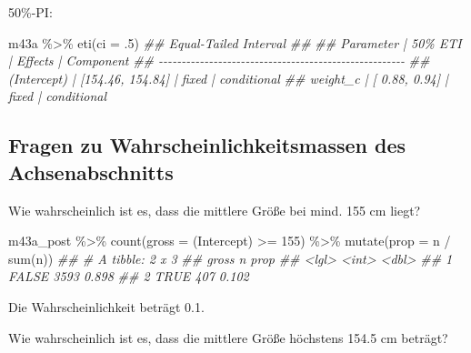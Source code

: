 \documentclass[
  a4paper,
  DIV=11]{scrreprt}
\newenvironment{Shaded}{\begin{snugshade}}{\end{snugshade}}
\newcommand{\AttributeTok}[1]{\textcolor[rgb]{0.40,0.45,0.13}{#1}}
\newcommand{\DecValTok}[1]{\textcolor[rgb]{0.68,0.00,0.00}{#1}}
\newcommand{\DocumentationTok}[1]{\textcolor[rgb]{0.37,0.37,0.37}{\textit{#1}}}
\newcommand{\FunctionTok}[1]{\textcolor[rgb]{0.28,0.35,0.67}{#1}}
\newcommand{\NormalTok}[1]{\textcolor[rgb]{0.00,0.23,0.31}{#1}}
\newcommand{\SpecialCharTok}[1]{\textcolor[rgb]{0.37,0.37,0.37}{#1}}
\newcommand{\StringTok}[1]{\textcolor[rgb]{0.13,0.47,0.30}{#1}}
\theoremstyle{definition}
\theoremstyle{remark}
\begin{document}
50\%-PI:

\begin{Shaded}
\begin{Highlighting}[]
\NormalTok{m43a }\SpecialCharTok{\%\textgreater{}\%} 
  \FunctionTok{eti}\NormalTok{(}\AttributeTok{ci =}\NormalTok{ .}\DecValTok{5}\NormalTok{)}
\DocumentationTok{\#\# Equal{-}Tailed Interval}
\DocumentationTok{\#\# }
\DocumentationTok{\#\# Parameter   |          50\% ETI | Effects |   Component}
\DocumentationTok{\#\# {-}{-}{-}{-}{-}{-}{-}{-}{-}{-}{-}{-}{-}{-}{-}{-}{-}{-}{-}{-}{-}{-}{-}{-}{-}{-}{-}{-}{-}{-}{-}{-}{-}{-}{-}{-}{-}{-}{-}{-}{-}{-}{-}{-}{-}{-}{-}{-}{-}{-}{-}{-}{-}{-}}
\DocumentationTok{\#\# (Intercept) | [154.46, 154.84] |   fixed | conditional}
\DocumentationTok{\#\# weight\_c    | [  0.88,   0.94] |   fixed | conditional}
\end{Highlighting}
\end{Shaded}

\hypertarget{fragen-zu-wahrscheinlichkeitsmassen-des-achsenabschnitts}{%
\subsection{Fragen zu Wahrscheinlichkeitsmassen des
Achsenabschnitts}\label{fragen-zu-wahrscheinlichkeitsmassen-des-achsenabschnitts}}

Wie wahrscheinlich ist es, dass die mittlere Größe bei mind. 155 cm
liegt?

\begin{Shaded}
\begin{Highlighting}[]
\NormalTok{m43a\_post }\SpecialCharTok{\%\textgreater{}\%} 
  \FunctionTok{count}\NormalTok{(}\AttributeTok{gross =} \StringTok{\textasciigrave{}}\AttributeTok{(Intercept)}\StringTok{\textasciigrave{}} \SpecialCharTok{\textgreater{}=} \DecValTok{155}\NormalTok{) }\SpecialCharTok{\%\textgreater{}\%} 
  \FunctionTok{mutate}\NormalTok{(}\AttributeTok{prop =}\NormalTok{ n }\SpecialCharTok{/} \FunctionTok{sum}\NormalTok{(n))}
\DocumentationTok{\#\# \# A tibble: 2 x 3}
\DocumentationTok{\#\#   gross     n  prop}
\DocumentationTok{\#\#   \textless{}lgl\textgreater{} \textless{}int\textgreater{} \textless{}dbl\textgreater{}}
\DocumentationTok{\#\# 1 FALSE  3593 0.898}
\DocumentationTok{\#\# 2 TRUE    407 0.102}
\end{Highlighting}
\end{Shaded}

Die Wahrscheinlichkeit beträgt 0.1.

Wie wahrscheinlich ist es, dass die mittlere Größe höchstens 154.5 cm
beträgt?
\end{document}
